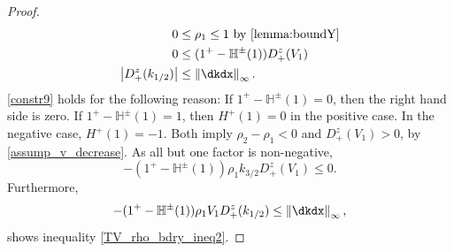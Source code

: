 \begin{proof}
\begin{align}
		0 &\leq  \rho_{1} \leq 1 \text{ by } \eqref{lemma:boundY} \label{constr8}\\ 
		0 &\leq (1^+-\mathbb{H}^\pm(1))D_+^z(V_{1}) \label{constr9}\\ 
		\left|D_+^z(k_{1/2})\right| &\leq \norm{\dkdx}_\infty. \label{constr10} 
	\end{align} 
 	\eqref{constr9} holds for the following reason: If $1^+ -\mathbb{H}^\pm(1) = 0$, then the right hand side is zero. If $1^+ -\mathbb{H}^\pm(1) = 1$, then $H^+(1) = 0$ in the positive case. In the negative case, $H^+(1) = -1$. Both imply $\rho_2 - \rho_1 < 0$ and $D_+^z(V_{1}) > 0$, by \eqref{assump_v_decrease}. As all but one factor is non-negative,  
 	\begin{equation}
 		-(1^+ -\mathbb{H}^\pm(1))\rho_{1} k_{3/2} D_+^z(V_{1}) \leq 0.
 	\end{equation}
 	Furthermore, 
 	\begin{equation}
 		-(1^+ -\mathbb{H}^\pm(1))\rho_{1}V_1 D_+^z(k_{1/2}) \leq \norm{\dkdx}_\infty, 
 	\end{equation}
 	shows inequality \eqref{TV_rho_bdry_ineq2}.
 	

\end{proof}
